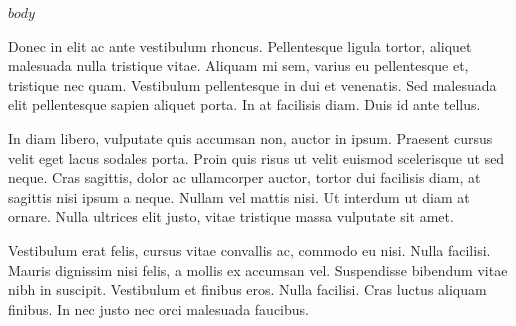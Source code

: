 \documentclass[
	a4paper, %
	12pt, %
]{include/CSSullivanBusinessReport}
\begin{document}
\newpage

\begin{twothirdswidth} %
	\tableofcontents %
\end{twothirdswidth}

\newpage


$body$

Donec in elit ac ante vestibulum rhoncus. Pellentesque ligula tortor, aliquet malesuada nulla tristique vitae. Aliquam mi sem, varius eu pellentesque et, tristique nec quam. Vestibulum pellentesque in dui et venenatis. Sed malesuada elit pellentesque sapien aliquet porta. In at facilisis diam. Duis id ante tellus. %

In diam libero, vulputate quis accumsan non, auctor in ipsum. Praesent cursus velit eget lacus sodales porta. Proin quis risus ut velit euismod scelerisque ut sed neque. Cras sagittis, dolor ac ullamcorper auctor, tortor dui facilisis diam, at sagittis nisi ipsum a neque. Nullam vel mattis nisi. Ut interdum ut diam at ornare. Nulla ultrices elit justo, vitae tristique massa vulputate sit amet.

Vestibulum erat felis, cursus vitae convallis ac, commodo eu nisi. Nulla facilisi. Mauris dignissim nisi felis, a mollis ex accumsan vel. Suspendisse bibendum vitae nibh in suscipit. Vestibulum et finibus eros. Nulla facilisi. Cras luctus aliquam finibus. In nec justo nec orci malesuada faucibus.
\end{document}
